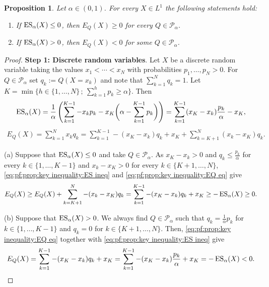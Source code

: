 \documentclass[12pt]{article}
\theoremstyle{plain}
\newtheorem{proposition}[theorem]{Proposition}
\theoremstyle{definition}
\theoremstyle{remark}
\numberwithin{equation}{section}
\newcommand{\E}{E}
\newcommand{\probq}{Q}
\newcommand{\Q}{Q}
\newcommand{\cP}{\mathcal{P}}
\newcommand{\ES}{\mathop {\rm ES}\nolimits}
\begin{document}
\begin{proposition}
\label{prop: key inequality}
Let $\alpha\in(0,1)$. For every $X \in L^1$ the following statements hold:
\begin{enumerate}
    \item If $\ES_\alpha(X)\le0$, then $\E_\probq\left(X\right)\ge0$ for every $\Q \in \cP_\alpha$. 
    \item If $\ES_\alpha(X) > 0$, then $\E_\probq\left(X\right)<0$ for some $\Q \in \cP_\alpha$.
\end{enumerate}
\end{proposition}

\begin{proof}
{\bf Step 1: Discrete random variables}. Let $X$ be a discrete random variable taking the values $x_1 < \cdots < x_N$ with probabilities $p_1, \ldots, p_N > 0$. For $\Q \in \cP_\alpha$ set $q_k :=  \Q(X = x_k)$ and note that $\sum_{k=1}^Nq_k=1$. Let $K=\min\{h\in\{1,\dots,N\} \,; \ \sum_{k =1}^h p_k \geq \alpha\}$. Then 
\begin{align}
\label{eq:pf:prop:key inequality:ES ineq}
\ES_\alpha(X) = \frac{1}{\alpha} \left(\sum_{k =1}^{K-1} -x_k p_k - x_K \bigg(\alpha - \sum_{k=1}^{K-1} p_k \bigg)\right)=  \sum_{k =1}^{K-1} (x_K - x_k) \frac{p_k}{\alpha} - x_K,
\end{align}
\begin{align}
\label{eq:pf:prop:key inequality:EQ eq}
\E_\probq(X) = \sum_{k=1}^Nx_kq_k = 
\sum_{k =1}^{K-1} -(x_K - x_k) q_k + x_K + \sum_{k =K+1}^N (x_k - x_K) q_k.
\end{align}

(a) Suppose that $\ES_\alpha(X)\le0$ and take $\Q \in \cP_\alpha$. As $x_K-x_k>0$ and $q_k \leq \frac{p_k}{\alpha}$ for every $k\in\{1,\dots,K-1\}$ and $x_k-x_K>0$ for every $k\in\{K+1,\dots,N\}$, \eqref{eq:pf:prop:key inequality:ES ineq} and \eqref{eq:pf:prop:key inequality:EQ eq} give
\[
\E_\probq(X) \ge \E_\probq(X)+\sum_{k =K+1}^N -(x_k - x_K) q_k = \sum_{k =1}^{K-1} -(x_K - x_k) q_k + x_K \ge -\ES_\alpha(X) \ge 0.
\]

(b) Suppose that $\ES_\alpha(X)>0$. We always find $\Q \in \cP_\alpha$ such that $q_k = \frac{1}{\alpha} p_k$ for $k \in \{1, \ldots, K-1\}$ and $q_k = 0$ for $k \in \{K+1, \ldots, N\}$. Then, \eqref{eq:pf:prop:key inequality:EQ eq} together with \eqref{eq:pf:prop:key inequality:ES ineq} give
\begin{equation*}
\E_\probq(X) = \sum_{k =1}^{K-1} -(x_K - x_k) q_k + x_K = \sum_{k =1}^{K-1} -(x_K - x_k) \frac{p_k}{\alpha} + x_K = - \ES_\alpha(X) < 0.
\end{equation*}


\end{proof}
\end{document}
